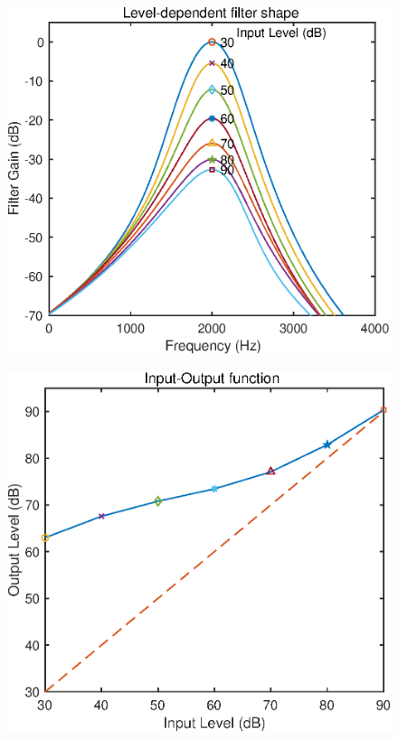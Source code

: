 \begin{figure}[h]
    \begin{minipage}[t]{0.5\hsize}
        \vspace{50pt}
        \centering
        \includegraphics[width=\linewidth]{Figure/RelatedResearch/DemoAF_Basic_FilterLevelDepend.eps}
        \label{fig:Basic_FilterLevelDepend}
    \end{minipage}
    \begin{minipage}[t]{0.5\hsize}
        \vspace{50pt}
        \centering
        \includegraphics[width=0.96\linewidth]{Figure/RelatedResearch/DemoAF_Basic_IOfunc.eps}

\end{minipage}
\end{figure}
